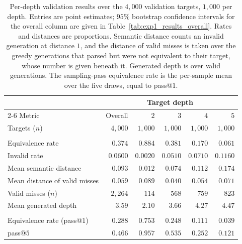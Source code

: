 \documentclass[titlepage,a4paper,11pt]{report}
\begin{document}
    \begin{table}[ht]
        \centering
        \caption{Per-depth validation results over the $4{,}000$ validation targets, $1{,}000$ per depth. Entries are point estimates; $95\%$ bootstrap confidence intervals for the overall column are given in Table~\ref{tab:exp1_results_overall}. Rates and distances are proportions. Semantic distance counts an invalid generation at distance $1$, and the distance of valid misses is taken over the greedy generations that parsed but were not equivalent to their target, whose number is given beneath it. Generated depth is over valid generations. The sampling-pass equivalence rate is the per-sample mean over the five draws, equal to \textup{pass}@$1$.}
        \label{tab:exp1_results_by_depth}
        \begin{tabular}{lrrrrr}
            \toprule
            & \multicolumn{5}{c}{Target depth} \\
            \cmidrule(l){2-6}
            Metric & Overall & $2$ & $3$ & $4$ & $5$ \\
            \midrule
            Targets ($n$) & $4{,}000$ & $1{,}000$ & $1{,}000$ & $1{,}000$ & $1{,}000$ \\
            \addlinespace
            \multicolumn{6}{l}{\emph{Greedy pass}} \\
            \quad Equivalence rate               & $0.374$ & $0.884$ & $0.381$ & $0.170$ & $0.061$ \\
            \quad Invalid rate                   & $0.0600$ & $0.0020$ & $0.0510$ & $0.0710$ & $0.1160$ \\
            \quad Mean semantic distance         & $0.093$ & $0.012$ & $0.074$ & $0.112$ & $0.174$ \\
            \quad Mean distance of valid misses  & $0.059$ & $0.089$ & $0.040$ & $0.054$ & $0.071$ \\
            \quad\quad Valid misses ($n$)        & $2{,}264$ & $114$ & $568$ & $759$ & $823$ \\
            \quad Mean generated depth           & $3.59$ & $2.10$ & $3.66$ & $4.27$ & $4.47$ \\
            \addlinespace
            \multicolumn{6}{l}{\emph{Sampling pass}} \\
            \quad Equivalence rate (pass@$1$)    & $0.288$ & $0.753$ & $0.248$ & $0.111$ & $0.039$ \\
            \quad pass@$5$                       & $0.466$ & $0.957$ & $0.535$ & $0.252$ & $0.121$ \\

\end{tabular}
\end{table}
\end{document}
